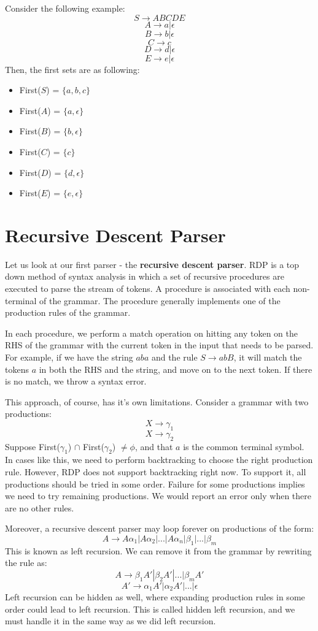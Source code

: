 \documentclass[12pt,letterpaper]{amsbook}
\theoremstyle{definition}
\begin{document}
Consider the following example:
\[S \rightarrow ABCDE\]
\[A \rightarrow a|\epsilon\]
\[B \rightarrow b|\epsilon\]
\[C \rightarrow c\]
\[D \rightarrow d|\epsilon\]
\[E \rightarrow e|\epsilon\]
Then, the first sets are as following:
\begin{itemize}
  \item First($S$) = $\{a,b,c\}$
  \item First($A$) = $\{a,\epsilon\}$
  \item First($B$) = $\{b,\epsilon\}$
  \item First($C$) = $\{c\}$
  \item First($D$) = $\{d,\epsilon\}$
  \item First($E$) = $\{e,\epsilon\}$
\end{itemize}

\section{Recursive Descent Parser}

Let us look at our first parser - the \textbf{recursive descent parser}. RDP is a top down method of syntax analysis in which a set of recursive procedures are executed to parse the stream of tokens. A procedure is associated with each non-terminal of the grammar. The procedure generally implements one of the production rules of the grammar.

In each procedure, we perform a match operation on hitting any token on the RHS of the grammar with the current token in the input that needs to be parsed. For example, if we have the string $aba$ and the rule $S \rightarrow abB$, it will match the tokens $a$ in both the RHS and the string, and move on to the next token. If there is no match, we throw a syntax error.

This approach, of course, has it's own limitations. Consider a grammar with two productions:
\[X \rightarrow \gamma_1\]
\[X \rightarrow \gamma_2\]
Suppose First($\gamma_1$) $\cap$ First($\gamma_2$) $\neq \phi$, and that $a$ is the common terminal symbol. In cases like this, we need to perform backtracking to choose the right production rule. However, RDP does not support backtracking right now. To support it, all productions should be tried in some order. Failure for some productions implies we need to try remaining productions. We would report an error only when there are no other rules.

Moreover, a recursive descent parser may loop forever on productions of the form:
\[A \rightarrow A \alpha_1|A \alpha_2 | ... | A \alpha_n | \beta_1 | ... | \beta_m\]
This is known as left recursion. We can remove it from the grammar by rewriting the rule as:
\[A \rightarrow \beta_1 A' | \beta_2 A' | ... | \beta_m A'\]
\[A' \rightarrow \alpha_1 A'| \alpha_2 A' | ... | \epsilon\]
Left recursion can be hidden as well, where expanding production rules in some order could lead to left recursion. This is called hidden left recursion, and we must handle it in the same way as we did left recursion.
\end{document}

